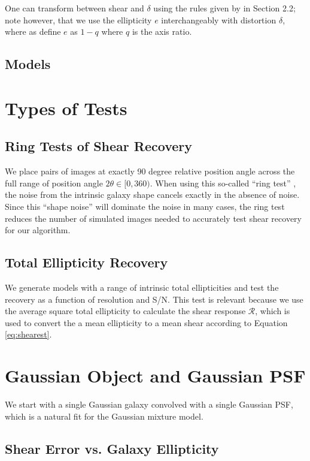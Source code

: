 \documentclass[10pt,preprint]{aastex}
\newcommand{\psf}{PSF}
\newcommand{\Rshear}{\ensuremath{\mathcal{R}}}
\begin{document}
One can transform between shear and $\delta$ using the rules given by
\citet{bern02} in Section 2.2; note however, that we use the ellipticity 
$e$ interchangeably with distortion $\delta$, where as \citet{bern02} define
$e$ as $1-q$ where $q$ is the axis ratio.

\subsection{Models}

\section{Types of Tests}

\subsection{Ring Tests of Shear Recovery}

We place pairs of images at exactly 90 degree relative position angle across
the full range of position angle $2 \theta \in [0,360)$.  When using this
so-called ``ring test'' \citep{Nakajima2007}, the noise from the intrinsic
galaxy shape cancels exactly in the absence of noise.  Since this ``shape
noise'' will dominate the noise in many cases, the ring test reduces the number
of simulated images needed to accurately test shear recovery for our algorithm.

\subsection{Total Ellipticity Recovery}

We generate models with a range of intrinsic total ellipticities and test the
recovery as a function of resolution and S/N.  This test is relevant because we
use the average square total ellipticity to calculate the shear response
\Rshear, which is used to convert the a mean ellipticity to a
mean shear according to Equation \ref{eq:shearest}.

\section{Gaussian Object and Gaussian \psf}

We start with a single Gaussian galaxy convolved with a single Gaussian \psf,
which is a natural fit for the Gaussian mixture model.  

\subsection{Shear Error vs. Galaxy Ellipticity}
\end{document}
